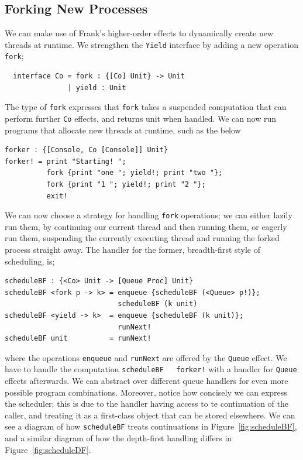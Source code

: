 \documentclass[msc,deptreport,cs]{infthesis} %
\newcommand{\code}[1]{\lstinline{#1}}
\begin{document}
\subsection{Forking New Processes}

We can make use of Frank's higher-order effects to dynamically create new
threads at runtime. We strengthen the \code{Yield} interface by adding a new
operation \code{fork};

\begin{lstlisting}
  interface Co = fork : {[Co] Unit} -> Unit
               | yield : Unit
\end{lstlisting}

The type of \code{fork} expresses that \code{fork} takes a suspended computation
that can perform further \code{Co} effects, and returns unit when handled. We
can now run programs that allocate new threads at runtime, such as the below

\begin{lstlisting}
forker : {[Console, Co [Console]] Unit}
forker! = print "Starting! ";
          fork {print "one "; yield!; print "two "};
          fork {print "1 "; yield!; print "2 "};
          exit!
\end{lstlisting}

We can now choose a strategy for handling \code{fork} operations; we can either
lazily run them, by continuing our current thread and then running them, or
eagerly run them, suspending the currently executing thread and running the
forked process straight away. The handler for the former, breadth-first style of
scheduling, is;

\begin{lstlisting}
scheduleBF : {<Co> Unit -> [Queue Proc] Unit}
scheduleBF <fork p -> k> = enqueue {scheduleBF (<Queue> p!)};
                           scheduleBF (k unit)
scheduleBF <yield -> k>  = enqueue {scheduleBF (k unit)};
                           runNext!
scheduleBF unit          = runNext!
\end{lstlisting}

\noindent where the operations \code{enqueue} and \code{runNext} are offered by
the \code{Queue} effect. We have to handle the computation \code{scheduleBF
  forker!} with a handler for \code{Queue} effects afterwards. We can abstract
over different queue handlers for even more possible program combinations.
Moreover, notice how concisely we can express the scheduler; this is due to the
handler having access to te continuation of the caller, and treating it as a
first-class object that can be stored elsewhere. We can see a diagram of how
\code{scheduleBF} treats continuations in Figure~\ref{fig:scheduleBF}, and a
similar diagram of how the depth-first handling differs in
Figure~\ref{fig:scheduleDF}.
\end{document}
